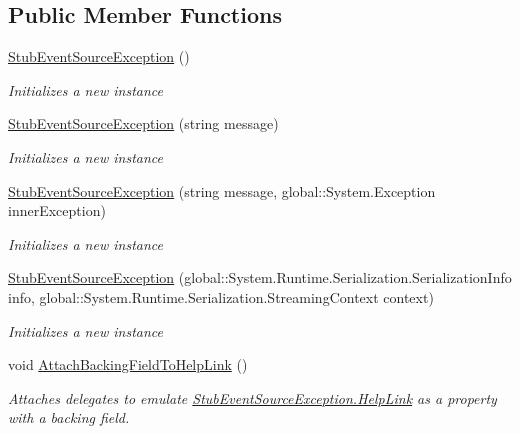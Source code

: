 \subsection*{Public Member Functions}
\begin{DoxyCompactItemize}
\item 
\hyperlink{class_system_1_1_diagnostics_1_1_tracing_1_1_fakes_1_1_stub_event_source_exception_a6ae68bd6d89c86e0dbdf8a79229cb910}{Stub\-Event\-Source\-Exception} ()
\begin{DoxyCompactList}\small\item\em Initializes a new instance\end{DoxyCompactList}\item 
\hyperlink{class_system_1_1_diagnostics_1_1_tracing_1_1_fakes_1_1_stub_event_source_exception_a2c346437fc5bc791f0dbd0525a885b51}{Stub\-Event\-Source\-Exception} (string message)
\begin{DoxyCompactList}\small\item\em Initializes a new instance\end{DoxyCompactList}\item 
\hyperlink{class_system_1_1_diagnostics_1_1_tracing_1_1_fakes_1_1_stub_event_source_exception_a7b3c010151ef6a4738d9d08b4c1d49bf}{Stub\-Event\-Source\-Exception} (string message, global\-::\-System.\-Exception inner\-Exception)
\begin{DoxyCompactList}\small\item\em Initializes a new instance\end{DoxyCompactList}\item 
\hyperlink{class_system_1_1_diagnostics_1_1_tracing_1_1_fakes_1_1_stub_event_source_exception_a5b6749937af7b441c95f1c587aa28f21}{Stub\-Event\-Source\-Exception} (global\-::\-System.\-Runtime.\-Serialization.\-Serialization\-Info info, global\-::\-System.\-Runtime.\-Serialization.\-Streaming\-Context context)
\begin{DoxyCompactList}\small\item\em Initializes a new instance\end{DoxyCompactList}\item 
void \hyperlink{class_system_1_1_diagnostics_1_1_tracing_1_1_fakes_1_1_stub_event_source_exception_a69fb628365d89bd13641d85fa2103b3e}{Attach\-Backing\-Field\-To\-Help\-Link} ()
\begin{DoxyCompactList}\small\item\em Attaches delegates to emulate \hyperlink{class_system_1_1_diagnostics_1_1_tracing_1_1_fakes_1_1_stub_event_source_exception_a08042d56f73df826c646e58c01e92ca8}{Stub\-Event\-Source\-Exception.\-Help\-Link} as a property with a backing field.\end{DoxyCompactList}\item 

\end{DoxyCompactItemize}
